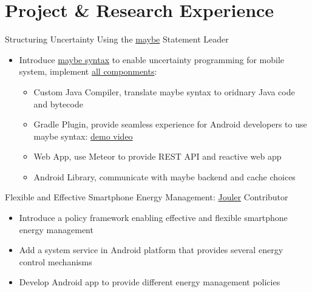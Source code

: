 \section{Project \& Research Experience}
{Structuring Uncertainty Using the \href{http://blue.cse.buffalo.edu/projects/maybe}{maybe} Statement}
{Leader}
{}
{}
{
  \begin{itemize}
  \item Introduce \href{https://blue-systems-research-group.gitbooks.io/maybe/content/concepts.html}{maybe syntax} to enable uncertainty programming for mobile system,
implement \href{https://blue-systems-research-group.gitbooks.io/maybe/content/}{all componments}:
    \begin{itemize}
      \item Custom Java Compiler, translate maybe syntax to oridnary Java code and bytecode
      \item Gradle Plugin, provide seamless experience for Android developers to use maybe syntax: \href{https://www.youtube.com/watch?v=RYcQ7WVunmc}{demo video}
      \item Web App, use Meteor to provide REST API and reactive web app
      \item Android Library, communicate with maybe backend and cache choices
    \end{itemize}
  \end{itemize}
}

{Flexible and Effective Smartphone Energy Management: \href{http://blue.cse.buffalo.edu/projects/jouler/}{Jouler}}
{Contributor}
{}
{}
{
  \begin{itemize}
    \item Introduce a policy framework enabling effective and flexible smartphone energy management
    \item Add a system service in Android platform that provides several energy control mechanisms
    \item Develop Android app to provide different energy management policies
  \end{itemize}
}

